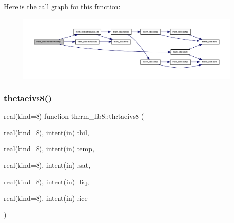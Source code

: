 Here is the call graph for this function\+:
\nopagebreak
\begin{figure}[H]
\begin{center}
\leavevmode
\includegraphics[width=350pt]{namespacetherm__lib8_a3a5271057d229a35bd188bd8cff5571b_cgraph}
\end{center}
\end{figure}
\mbox{\label{namespacetherm__lib8_a43786e4d4bcf61f6d8fb66fa5a925df9}} 
\subsubsection{\texorpdfstring{thetaeivs8()}{thetaeivs8()}}
{\footnotesize\ttfamily real(kind=8) function therm\+\_\+lib8\+::thetaeivs8 (\begin{DoxyParamCaption}\item[{real(kind=8), intent(in)}]{thil,  }\item[{real(kind=8), intent(in)}]{temp,  }\item[{real(kind=8), intent(in)}]{rsat,  }\item[{real(kind=8), intent(in)}]{rliq,  }\item[{real(kind=8), intent(in)}]{rice }\end{DoxyParamCaption})}

